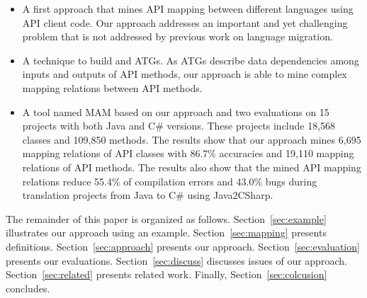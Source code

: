 \begin{itemize}\vspace*{-1.5ex}
\item A first approach that mines API mapping between
different languages using API client code. Our
approach addresses an important and yet challenging problem that is not
addressed by previous work on language migration.\vspace*{-1.5ex}
\item A technique to build and ATGs. As ATGs describe data dependencies among
inputs and outputs of API methods, our approach is able to mine
complex mapping relations between API methods.\vspace*{-1.5ex}
\item A tool named MAM based on our approach and two
evaluations on 15 projects with both Java and C\# versions. These
projects include 18,568 classes and 109,850 methods. The results
show that our approach mines 6,695 mapping relations of API classes
with 86.7\% accuracies and 19,110 mapping relations of API methods.
The results also show that the mined API mapping relations reduce
55.4\% of compilation errors and 43.0\% bugs during translation
projects from Java to C\# using Java2CSharp.
\end{itemize}\vspace*{-1.5ex}

The remainder of this paper is organized as follows. Section~\ref{sec:example}
illustrates our approach using an example. Section~\ref{sec:mapping}
presents definitions. Section~\ref{sec:approach} presents our
approach. Section~\ref{sec:evaluation} presents our evaluations.
Section~\ref{sec:discuss} discusses issues of our approach.
Section~\ref{sec:related} presents related work. Finally,
Section~\ref{sec:colcusion} concludes.

